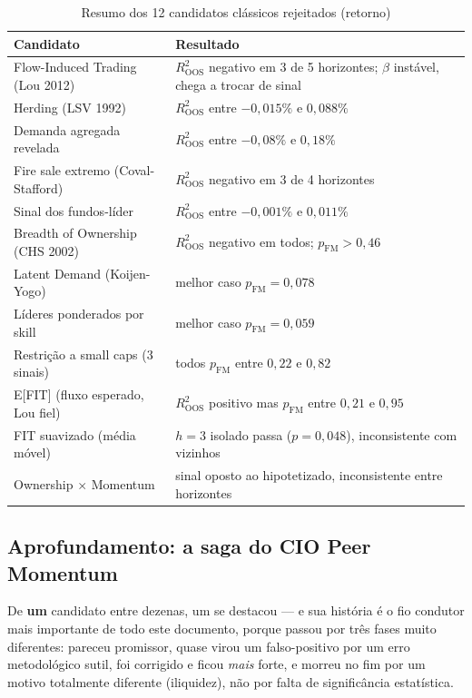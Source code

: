\documentclass[11pt,a4paper]{article}
\begin{document}
\begin{table}[H]\centering\small
\caption{Resumo dos 12 candidatos clássicos rejeitados (retorno)}
\begin{tabular}{@{}p{5.2cm}p{7.5cm}@{}}
\toprule
Candidato & Resultado \\
\midrule
Flow-Induced Trading (Lou 2012) & $R^2_{\text{OOS}}$ negativo em 3 de 5 horizontes; $\beta$ instável, chega a trocar de sinal \\
Herding (LSV 1992) & $R^2_{\text{OOS}}$ entre $-0{,}015\%$ e $0{,}088\%$ \\
Demanda agregada revelada & $R^2_{\text{OOS}}$ entre $-0{,}08\%$ e $0{,}18\%$ \\
Fire sale extremo (Coval-Stafford) & $R^2_{\text{OOS}}$ negativo em 3 de 4 horizontes \\
Sinal dos fundos-líder & $R^2_{\text{OOS}}$ entre $-0{,}001\%$ e $0{,}011\%$ \\
Breadth of Ownership (CHS 2002) & $R^2_{\text{OOS}}$ negativo em todos; $p_{\text{FM}}>0{,}46$ \\
Latent Demand (Koijen-Yogo) & melhor caso $p_{\text{FM}}=0{,}078$ \\
Líderes ponderados por skill & melhor caso $p_{\text{FM}}=0{,}059$ \\
Restrição a small caps (3 sinais) & todos $p_{\text{FM}}$ entre $0{,}22$ e $0{,}82$ \\
E[FIT] (fluxo esperado, Lou fiel) & $R^2_{\text{OOS}}$ positivo mas $p_{\text{FM}}$ entre $0{,}21$ e $0{,}95$ \\
FIT suavizado (média móvel) & $h=3$ isolado passa ($p=0{,}048$), inconsistente com vizinhos \\
Ownership $\times$ Momentum & sinal oposto ao hipotetizado, inconsistente entre horizontes \\
\bottomrule
\end{tabular}
\end{table}

\subsection{Aprofundamento: a saga do CIO Peer Momentum}
\label{sec:cio}

De \textbf{um} candidato entre dezenas, um se destacou --- e sua história
é o fio condutor mais importante de todo este documento, porque passou por
três fases muito diferentes: pareceu promissor, quase virou um
falso-positivo por um erro metodológico sutil, foi corrigido e ficou
\emph{mais} forte, e morreu no fim por um motivo totalmente diferente
(iliquidez), não por falta de significância estatística.
\end{document}
